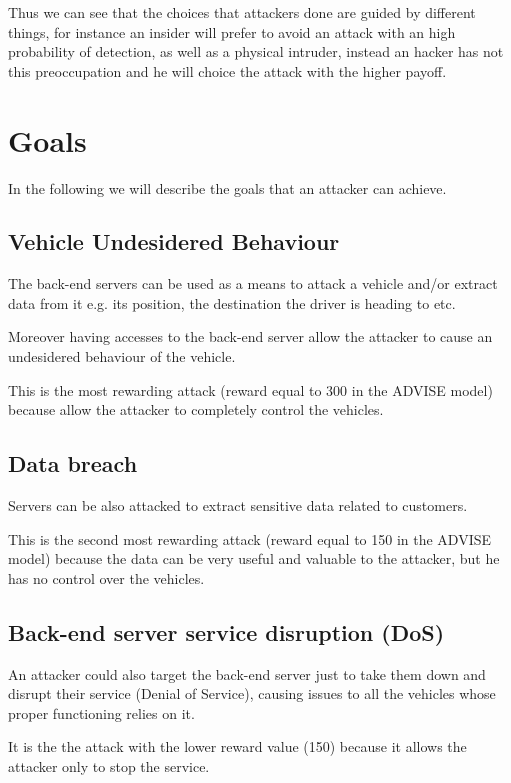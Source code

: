 \noindent  Thus we can see that the choices that attackers done are guided by different things, for instance an insider will prefer to avoid an attack with an high probability of detection, as well as a physical intruder, instead an hacker has not this preoccupation and he will choice the attack with the higher payoff.

\section{Goals}

\noindent In the following we will describe the goals that an attacker can achieve.

\subsection*{Vehicle Undesidered Behaviour}
The back-end servers can be used as a means to attack a vehicle and/or extract data from it e.g. its position, the destination the driver is heading to etc.

\noindent Moreover having accesses to the back-end server allow the attacker to cause an undesidered behaviour of the vehicle.

\noindent This is the most rewarding attack (reward equal to 300 in the ADVISE model) because allow the attacker to completely control the vehicles.

\subsection*{Data breach}
Servers can be also attacked to extract sensitive data related to customers.

\noindent This is the second most rewarding attack (reward equal to 150 in the ADVISE model) because the data can be very useful and valuable to the attacker, but he has no control over the vehicles.

\subsection*{Back-end server service disruption (DoS)}
An attacker could also target the back-end server just to take them down and disrupt their service (Denial of Service), causing issues to all the vehicles whose proper functioning relies on it.

\noindent It is the the attack with the lower reward value (150) because it allows the attacker only to stop the service.

